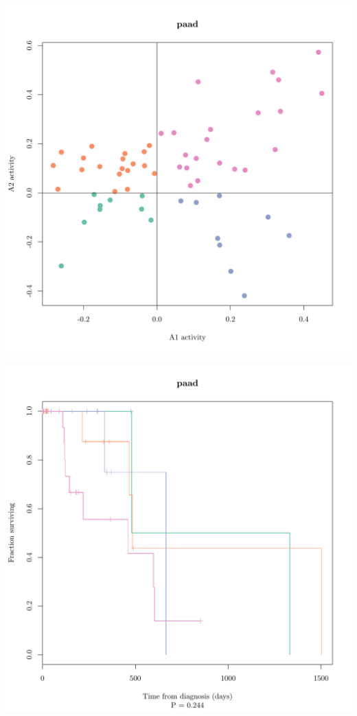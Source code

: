 \documentclass{article}\usepackage[]{graphicx}\usepackage[]{color}
\makeatletter
\def\maxwidth{ %
  \ifdim\Gin@nat@width>\linewidth
    \linewidth
  \else
    \Gin@nat@width
  \fi
}
\newenvironment{knitrout}{}{} %
\makeatother
\begin{document}
\begin{knitrout}
{\centering \includegraphics[width=\maxwidth]{figure/km-curves-15} 

}




{\centering \includegraphics[width=\maxwidth]{figure/km-curves-16} 

}



\end{knitrout}
\end{document}
